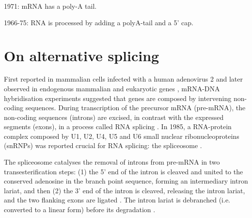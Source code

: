 



1971: mRNA has a poly-A tail.

1966-75: RNA is processed by adding a polyA-tail and a 5' cap.



\section{On alternative splicing}

First reported in mammalian cells infected with a human adenovirus 2 \cite{berget:1977wp,chow:1977wn} and later observed in endogenous mammalian and eukaryotic genes \cite{}, mRNA-DNA hybridisation experiments suggested that genes are composed by intervening non-coding sequences. During transcription of the precursor mRNA (pre-mRNA), the non-coding sequences (introns) are excised, in contrast with the expressed segments (exons), in a process called RNA splicing \cite{berget:1977wp,chow:1977wn,gilbert:1978wr}. In 1985, a RNA-protein complex composed by U1, U2, U4, U5 and U6 small nuclear ribonucleoproteins (snRNPs) was reported crucial for RNA splicing: the spliceosome \cite{grabowski:1985vm}.

The spliceosome catalyses the removal of introns from pre-mRNA in two transesterification steps: (1) the 5' end of the intron is cleaved and united to the conserved adenosine in the branch point sequence, forming an intermediary intron lariat, and then (2) the 3' end of the intron is cleaved, releasing the intron lariat, and the two flanking exons are ligated \cite{grabowski:1985vm,ruskin:1985vl,horowitz:1993wq}. The intron lariat is debranched (i.e. converted to a linear form) before its degradation \cite{ruskin:1985vl,arenas:1987vc}.

